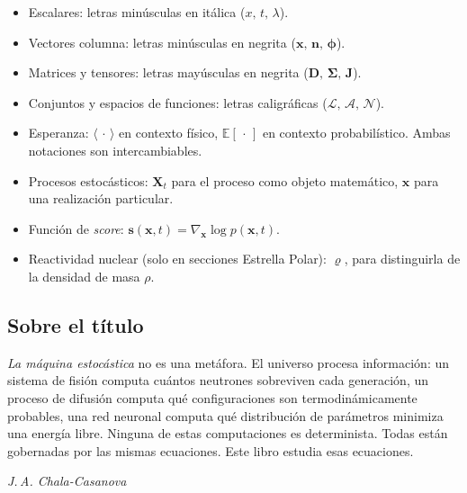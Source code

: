 \begin{itemize}
  \item Escalares: letras minúsculas en itálica ($x,\, t,\, \lambda$).
  \item Vectores columna: letras minúsculas en negrita
        ($\bm{x},\, \bm{n},\, \bm{\phi}$).
  \item Matrices y tensores: letras mayúsculas en negrita
        ($\bm{D},\, \bm{\Sigma},\, \bm{J}$).
  \item Conjuntos y espacios de funciones: letras caligráficas
        ($\mathcal{L},\, \mathcal{A},\, \mathcal{N}$).
  \item Esperanza: $\langle\,\cdot\,\rangle$ en contexto físico,
        $\mathbb{E}[\,\cdot\,]$ en contexto probabilístico. Ambas
        notaciones son intercambiables.
  \item Procesos estocásticos: $\bm{X}_t$ para el proceso como objeto
        matemático, $\bm{x}$ para una realización particular.
  \item Función de \textit{score}:
        $\bm{s}(\bm{x},t) = \nabla_{\bm{x}}\log p(\bm{x},t)$.
  \item Reactividad nuclear (solo en secciones Estrella Polar):
        $\varrho$, para distinguirla de la densidad de masa $\rho$.
\end{itemize}

\subsection*{Sobre el título}

\textit{La máquina estocástica} no es una metáfora. El universo procesa
información: un sistema de fisión computa cuántos neutrones sobreviven cada
generación, un proceso de difusión computa qué configuraciones son
termodinámicamente probables, una red neuronal computa qué distribución de
parámetros minimiza una energía libre. Ninguna de estas computaciones es
determinista. Todas están gobernadas por las mismas ecuaciones. Este libro
estudia esas ecuaciones.

\vspace{1.2cm}
\begin{flushright}
\textit{J.\,A. Chala-Casanova}\\[2pt]
\the\year
\end{flushright}